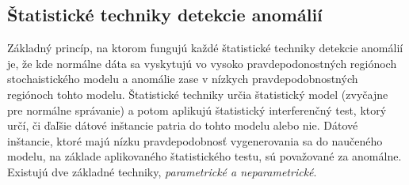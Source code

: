 \subsection{Štatistické techniky detekcie anomálií}
Základný princíp, na ktorom fungujú každé štatistické techniky detekcie anomálií je, že kde normálne dáta sa vyskytujú vo vysoko pravdepodonostných regiónoch  stochaistického modelu a anomálie zase v nízkych pravdepodobnostných regiónoch tohto modelu. Štatistické techniky určia štatistický model (zvyčajne pre normálne správanie) a potom aplikujú štatistický interferenčný test, ktorý určí, či ďaľšie dátové inštancie patria do tohto modelu alebo nie. Dátové inštancie, ktoré majú nízku pravdepodobnosť vygenerovania sa do naučeného modelu, na základe aplikovaného štatistického testu, sú považované za anomálne. Existujú dve základné techniky, \emph{parametrické a neparametrické}.\cite{Chandola}

